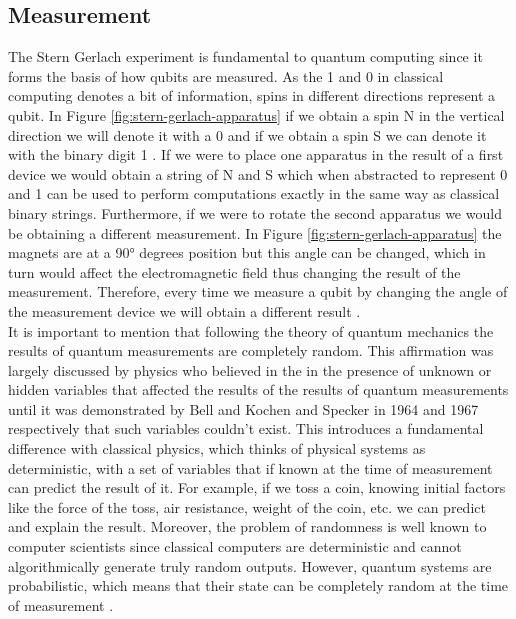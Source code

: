 \documentclass[12pt,a4paper]{scrartcl}
\begin{document}
\subsection{Measurement}\label{ss:measurement}
The Stern Gerlach experiment is fundamental to quantum computing since it forms the basis of how qubits are measured. As the 1 and 0 in classical computing denotes a bit of information, spins in different directions represent a qubit. In Figure \ref{fig:stern-gerlach-apparatus} if we obtain a spin N in the vertical direction we will denote it with a 0 and if we obtain a spin S we can denote it with the binary digit 1 \cite{bernhardt2019quantum}. If we were to place one apparatus in the result of a first device we would obtain a string of N and S which when abstracted to represent 0 and 1 can be used to perform computations exactly in the same way as classical binary strings. Furthermore, if we were to rotate the second apparatus we would be obtaining a different measurement. In Figure \ref{fig:stern-gerlach-apparatus} the magnets are at a 90° degrees position but this angle can be changed, which in turn would affect the electromagnetic field thus changing the result of the measurement. Therefore, every time we measure a qubit by changing the angle of the measurement device we will obtain a different result \cite{bernhardt2019quantum}. \\

It is important to mention that following the theory of quantum mechanics the results of quantum measurements are completely random. This affirmation was largely discussed by physics who believed in the in the presence of unknown or hidden variables that affected the results of the results of quantum measurements \cite{einstein1971born} until it was demonstrated by Bell \cite{Bell1964} and Kochen and Specker \cite{kochen-specker1967} in 1964 and 1967 respectively that such variables couldn't exist. This introduces a fundamental difference with classical physics, which thinks of physical systems as deterministic, with a set of variables that if known at the time of measurement can predict the result of it. For example, if we toss a coin, knowing initial factors like the force of the toss, air resistance, weight of the coin, etc. we can predict and explain the result. Moreover, the problem of randomness is well known to computer scientists since classical computers are deterministic and cannot algorithmically generate truly random outputs. However, quantum systems are probabilistic, which means that their state can be completely random at the time of measurement \cite{bernhardt2019quantum}.
\end{document}
